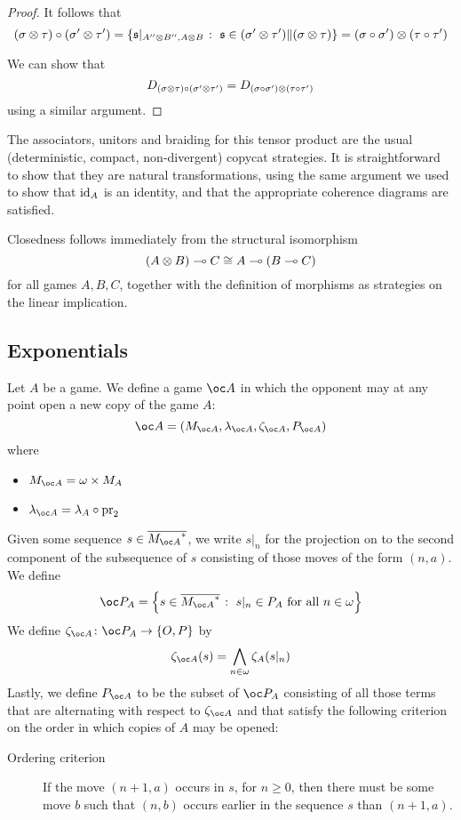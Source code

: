\documentclass{article}
\begin{document}
\begin{proposition}
\begin{proof}
    It follows that
    \[
      (\sigma\otimes\tau) \circ (\sigma'\otimes\tau')
      = \left\{\mathfrak s\vert_{A''\otimes B'', A\otimes B}\;\colon\;\mathfrak s\in(\sigma'\otimes\tau')\|(\sigma\otimes\tau)\right\}
      = (\sigma \circ \sigma')\otimes(\tau \circ \tau')
      \]

    We can show that
    \[
      D_{(\sigma\otimes\tau) \circ (\sigma'\otimes\tau')} = D_{(\sigma \circ \sigma')\otimes(\tau \circ \tau')}
      \]
    using a similar argument.
  \end{proof}
\end{proposition}

The associators, unitors and braiding for this tensor product are the usual (deterministic, compact, non-divergent) copycat strategies.  It is straightforward to show that they are natural transformations, using the same argument we used to show that $\operatorname{id}_A$ is an identity, and that the appropriate coherence diagrams are satisfied.  

Closedness follows immediately from the structural isomorphism
\[
  (A \otimes B) \multimap C \cong A \multimap (B \multimap C)
  \]
for all games $A,B,C$, together with the definition of morphisms as strategies on the linear implication.

\subsection{Exponentials}

Let $A$ be a game.  We define a game $\oc A$ in which the opponent may at any point open a new copy of the game $A$:
\[
  \oc A = (M_{\oc A}, \lambda_{\oc A}, \zeta_{\oc A}, P_{\oc A})
  \]
where
\begin{itemize}
  \item $M_{\oc A} = \omega \times M_A$
  \item $\lambda_{\oc A} = \lambda_A \circ \pr_2$
\end{itemize}

Given some sequence $s\in \seqs{M_{\oc A}}$, we write $s\vert_n$ for the projection on to the second component of the subsequence of $s$ consisting of those moves of the form $(n, a)$.  We define
\[
  \oc P_A = \left\{s\in\seqs{M_{\oc A}} \suchthat s\vert_n\in P_A \textrm{ for all $n\in\omega$}\right\}
  \]
We define $\zeta_{\oc A}\from \oc P_A\to\OP$ by
\[
  \zeta_{\oc A}(s) = \bigwedge_{n\in\omega}\zeta_A(s\vert_n)
  \]
Lastly, we define $P_{\oc A}$ to be the subset of $\oc P_A$ consisting of all those terms that are alternating with respect to $\zeta_{\oc A}$ and that satisfy the following criterion on the order in which copies of $A$ may be opened:
\begin{description}
  \item[Ordering criterion] If the move $(n + 1, a)$ occurs in $s$, for $n\ge 0$, then there must be some move $b$ such that $(n, b)$ occurs earlier in the sequence $s$ than $(n + 1, a)$.  
\end{description}
\end{document}
